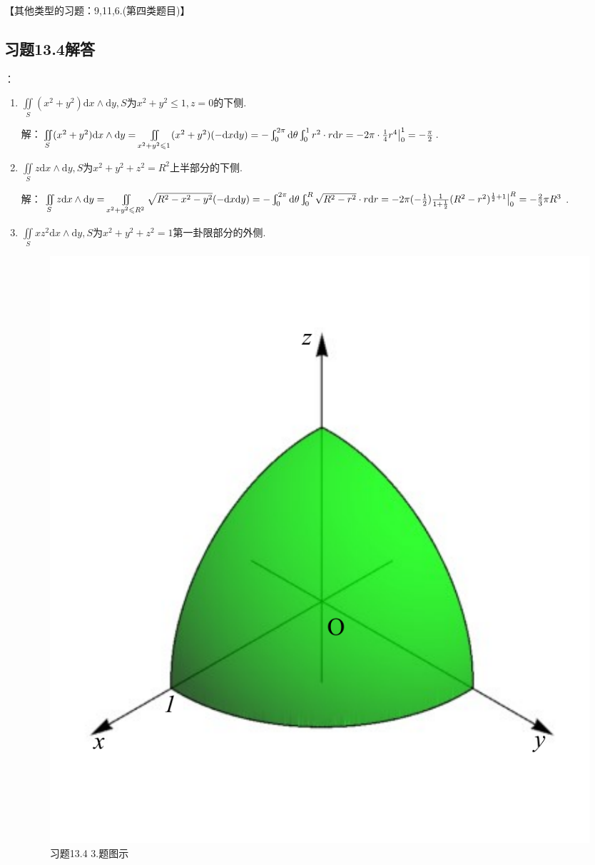 \documentclass[12pt,UTF8,fleqn]{ctexart}
\newcommand{\Int}[4]{\varint\nolimits_{#1}^{#2}#3\mathrm d#4}
\newcommand{\md}[1]{\mathrm d#1}
\newcommand{\BSIInt}[2]{\iint\limits_{#1}#2}
\begin{document}
\begin{enumerate}
\begin{enumerate}
【其他类型的习题：9,11,6.(第四类题目)】
\end{enumerate}
\end{enumerate}
\subsection{习题13.4解答}
：
\begin{enumerate}
\item$\BSIInt S{(x^2+y^2)\md x\wedge\md y},S$为$x^2+y^2\leqslant1,z=0$的下侧.

解：$\BSIInt S{(x^2+y^2)\md x\wedge\md y}=\BSIInt{x^2+y^2\leqslant1}{(x^2+y^2)(-\md x\md y)}=-\Int0{2\pi}{}\theta\Int01{r^2\cdot r}r=-2\pi\cdot\frac14r^4\big|_0^1\\
=-\frac\pi2$.

\item$\BSIInt S{z\md x\wedge\md y},S$为$x^2+y^2+z^2=R^2$上半部分的下侧.

解：$\BSIInt S{z\md x\wedge\md y}=\BSIInt{x^2+y^2\leqslant R^2}{\sqrt{R^2-x^2-y^2}(-\md x\md y)}=-\Int0{2\pi}{}\theta\Int0R{\sqrt{R^2-r^2}\cdot r}r\\
=-2\pi(-\frac12)\frac1{1+\frac12}(R^2-r^2)^{\frac12+1}\big|_0^R=-\frac23\pi R^3$.

\item$\BSIInt S{xz^2\md x\wedge\md y},S$为$x^2+y^2+z^2=1$第一卦限部分的外侧.

\begin{figure}[H]
\begin{center}
\includegraphics[height=0.5\textheight]{Figures23/Fig13-4-3.pdf}
\end{center}
\caption{习题13.4 3.题图示}
\label{13-4-3}
\end{figure}


\end{enumerate}
\end{document}
